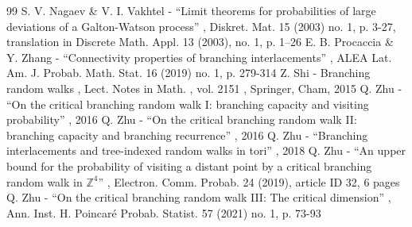 \documentclass[11pt]{article}
\numberwithin{equation}{section}
\theoremstyle{plain}
\theoremstyle{definition}
\newcommand{\1}{{\text{\Large $\mathfrak 1$}}}
\begin{document}
\begin{thebibliography}{99}
 S. V. Nagaev \& V. I. Vakhtel - “Limit theorems for probabilities of large deviations of a Galton-Watson process” , Diskret. Mat. 15 (2003) no. 1, p. 3-27, translation in Discrete Math. Appl. 13 (2003), no. 1, p. 1–26
 E. B. Procaccia \& Y. Zhang - “Connectivity properties of branching interlacements” , ALEA Lat. Am. J. Probab. Math. Stat. 16 (2019) no. 1, p. 279-314
 Z. Shi - Branching random walks , Lect. Notes in Math. , vol. 2151 , Springer, Cham, 2015
 Q. Zhu - “On the critical branching random walk I: branching capacity and visiting probability” , 2016
 Q. Zhu - “On the critical branching random walk II: branching capacity and branching recurrence” , 2016
 Q. Zhu - “Branching interlacements and tree-indexed random walks in tori” , 2018
 Q. Zhu - “An upper bound for the probability of visiting a distant point by a critical branching random walk in $\mathbb{Z}^4$” , Electron. Comm. Probab. 24 (2019), article ID 32, 6 pages
 Q. Zhu - “On the critical branching random walk III: The critical dimension” , Ann. Inst. H. Poincaré Probab. Statist. 57 (2021) no. 1, p. 73-93
\end{thebibliography}
\end{document}
